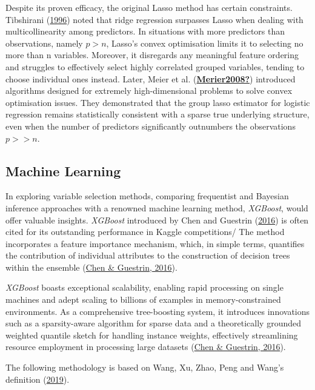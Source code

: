 \documentclass[
  11pt,
]{article}
\begin{document}
Despite its proven efficacy, the original Lasso method has certain
constraints. Tibshirani (\protect\hyperlink{ref-Tibshirani1996}{1996})
noted that ridge regression surpasses Lasso when dealing with
multicollinearity among predictors. In situations with more predictors
than observations, namely \(p > n\), Lasso's convex optimisation limits
it to selecting no more than n variables. Moreover, it disregards any
meaningful feature ordering and struggles to effectively select highly
correlated grouped variables, tending to choose individual ones instead.
Later, Meier et al.
(\protect\hyperlink{ref-Merier2008}{\textbf{Merier2008?}}) introduced
algorithms designed for extremely high-dimensional problems to solve
convex optimisation issues. They demonstrated that the group lasso
estimator for logistic regression remains statistically consistent with
a sparse true underlying structure, even when the number of predictors
significantly outnumbers the observations \(p >> n\).

\subsection{Machine Learning}

In exploring variable selection methods, comparing frequentist and
Bayesian inference approaches with a renowned machine learning method,
\emph{XGBoost}, would offer valuable insights. \emph{XGBoost} introduced
by Chen and Guestrin (\protect\hyperlink{ref-Chen2016}{2016}) is often
cited for its outstanding performance in Kaggle competitions/ The method
incorporates a feature importance mechanism, which, in simple terms,
quantifies the contribution of individual attributes to the construction
of decision trees within the ensemble
(\protect\hyperlink{ref-Chen2016}{Chen \& Guestrin, 2016}).

\emph{XGBoost} boasts exceptional scalability, enabling rapid processing
on single machines and adept scaling to billions of examples in
memory-constrained environments. As a comprehensive tree-boosting
system, it introduces innovations such as a sparsity-aware algorithm for
sparse data and a theoretically grounded weighted quantile sketch for
handling instance weights, effectively streamlining resource employment
in processing large datasets (\protect\hyperlink{ref-Chen2016}{Chen \&
Guestrin, 2016}).

The following methodology is based on Wang, Xu, Zhao, Peng and Wang's
definition (\protect\hyperlink{ref-Wang2019}{2019}).
\end{document}

